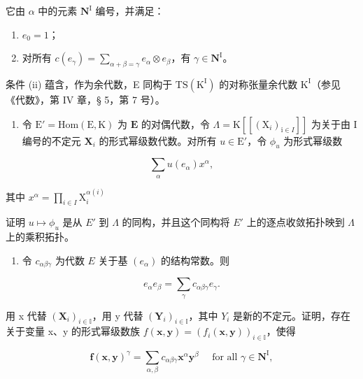 它由 \(\alpha\) 中的元素 \(\mathbf{N}^{\mathrm{I}}\) 编号，并满足：

\begin{enumerate}
\def\labelenumi{(\roman{enumi})}
\item
  \(e_{0} = 1\)；
\item
  对所有 \(c(e_{\gamma}) = \sum_{\alpha + \beta = \gamma} e_{\alpha} \otimes e_{\beta}\)，有 \(\gamma \in \mathbf{N}^{\mathrm{I}}\)。
\end{enumerate}

条件 (ii) 蕴含，作为余代数，E 同构于 \(\mathrm{TS}(\mathrm{K}^{\mathrm{I}})\) 的对称张量余代数 \(\mathrm{K}^{\mathrm{I}}\)（参见《代数》，第 IV 章，§ 5，第 7 号）。

\begin{enumerate}
\def\labelenumi{(\alph{enumi})}
\tightlist
\item
  令 \(\mathrm{E}' = \mathrm{Hom}(\mathrm{E},\mathrm{K})\) 为 \(\mathbf{E}\) 的对偶代数，令 \(\Lambda = \mathrm{K}[[(\mathrm{X}_i)_{\mathrm{i}\in I}]]\) 为关于由 I 编号的不定元 \(\mathbf{X}_i\) 的形式幂级数代数。对所有 \(u\in \mathrm{E}'\)，令 \(\phi_u\) 为形式幂级数
\end{enumerate}

\[
\sum_ {\alpha} u (e _ {\alpha}) x ^ {\alpha},
\]

其中 \(x^{\alpha} = \prod_{i\in I}\mathrm{X}_{i}^{\alpha (i)}\)

证明 \(u \mapsto \phi_u\) 是从 \(E'\) 到 \(\Lambda\) 的同构，并且这个同构将 \(E'\) 上的逐点收敛拓扑映到 \(\Lambda\) 上的乘积拓扑。

\begin{enumerate}
\def\labelenumi{(\alph{enumi})}
\setcounter{enumi}{1}
\tightlist
\item
  令 \(c_{\alpha \beta \gamma}\) 为代数 \(E\) 关于基 \((e_{\alpha})\) 的结构常数。则
\end{enumerate}

\[
e _ {\alpha} e _ {\beta} = \sum_ {\gamma} c _ {\alpha \beta \gamma} e _ {\gamma}.
\]

用 x 代替 \((\mathbf{X}_{i})_{i\in\mathbb{I}}\)，用 y 代替 \((\mathbf{Y}_{i})_{i\in\mathbb{I}}\)，其中 \(Y_{i}\) 是新的不定元。证明，存在关于变量 x、y 的形式幂级数族 \(f(\boldsymbol{x},\boldsymbol{y})=(f_{i}(\boldsymbol{x},\boldsymbol{y}))_{i\in\mathbb{I}}\)，使得

\[
\boldsymbol {f} (\boldsymbol {x}, \boldsymbol {y}) ^ {\gamma} = \sum_ {\alpha , \beta} c _ {\alpha \beta \gamma} \boldsymbol {x} ^ {\alpha} \boldsymbol {y} ^ {\beta} \quad \text { for   all } \gamma \in \mathbf {N} ^ {\mathrm{I}},
\]

